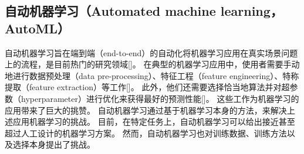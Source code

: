 


\subsection{自动机器学习（Automated machine learning，AutoML）}

自动机器学习旨在端到端（end-to-end）的自动化将机器学习应用在真实场景问题上的流程，是目前热门的研究领域[]。
在典型的机器学习应用中，使用者需要手动地进行数据预处理（data pre-processing）、特征工程（feature engineering）、特称提取（feature extraction）等工作[]。
此外，他们还需要选择恰当地算法并对超参数（hyperparameter）进行优化来获得最好的{\model}预测性能[]。
这些工作为机器学习的应用带来了巨大的挑赞。
自动机器学习通过基于机器学习本身的方法，来解决上述应用机器学习的挑战。
目前，在特定任务上，自动机器学习可以给出接近甚至超过人工设计的机器学习方案。
然而，自动机器学习也对训练数据、训练方法以及{\model}选择本身提出了挑战。



